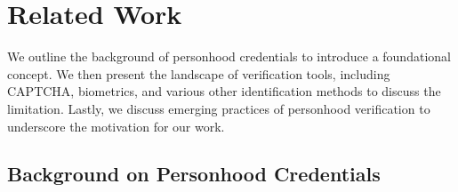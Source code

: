\vspace{-2mm}
\section{Related Work}
\vspace{-2mm}
We outline the background of personhood credentials to introduce a foundational concept.
We then present the landscape of verification tools, including CAPTCHA, biometrics, and various other identification methods to discuss the limitation. Lastly, we discuss emerging practices of personhood verification to underscore the motivation for our work. 
\vspace{-2mm}
\subsection{Background on Personhood Credentials}
\vspace{-2mm}

